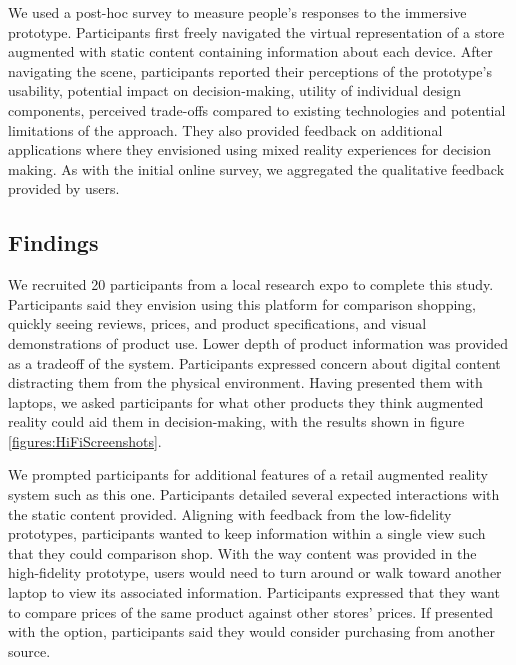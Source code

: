 We used a post-hoc survey to measure people's responses to the immersive prototype. Participants first freely navigated the virtual representation of a store augmented with static content containing information about each device. 
After navigating the scene, participants reported their perceptions of the prototype's usability, potential impact on decision-making, utility of individual design components, perceived trade-offs compared to existing technologies and potential limitations of the approach. They also provided feedback on additional applications where they envisioned using mixed reality experiences for decision making. As with the initial online survey, we aggregated the qualitative feedback provided by users.


\subsection{Findings}
We recruited 20 participants from a local research expo to complete this study. Participants said they envision using this platform for comparison shopping, quickly seeing reviews, prices, and product specifications, and visual demonstrations of product use. Lower depth of product information was provided as a tradeoff of the system. Participants expressed concern about digital content distracting them from the physical environment. Having presented them with laptops, we asked participants for what other products they think augmented reality could aid them in decision-making, with the results shown in figure \ref{figures:HiFiScreenshots}. 

We prompted participants for additional features of a retail augmented reality system such as this one. Participants detailed several expected interactions with the static content provided. Aligning with feedback from the low-fidelity prototypes, participants wanted to keep information within a single view such that they could comparison shop. With the way content was provided in the high-fidelity prototype, users would need to turn around or walk toward another laptop to view its associated information. Participants expressed that they want to compare prices of the same product against other stores' prices. If presented with the option, participants said they would consider purchasing from another source.